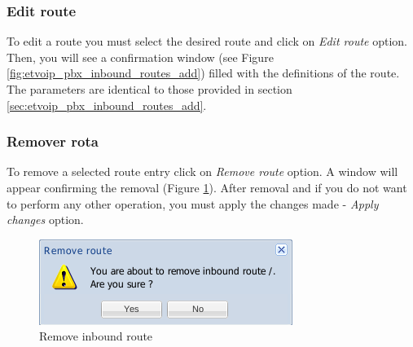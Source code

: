 \subsubsection{Edit route}
To edit a route you must select the desired route and click on \emph{Edit route} option. Then, you will see a confirmation window (see Figure \ref{fig:etvoip_pbx_inbound_routes_add}) filled with the definitions of the route.
The parameters are identical to those provided in section \ref{sec:etvoip_pbx_inbound_routes_add}.

\subsubsection{Remover rota}
To remove a selected route entry click on \emph{Remove route} option.
A window will appear confirming the removal (Figure \ref{fig:etvoip_pbx_inbound_routes_remove}). After removal and if you do not want to perform any other operation, you must apply the changes made - \emph{Apply changes} option.

\begin{figure}[H]
        \begin{center}
        \includegraphics[scale=0.6]{screenshots/etvoip_pbx_inbound_routes_remove.png}
        \caption{Remove inbound route}
        \label{fig:etvoip_pbx_inbound_routes_remove}
        \end{center}
\end{figure}

